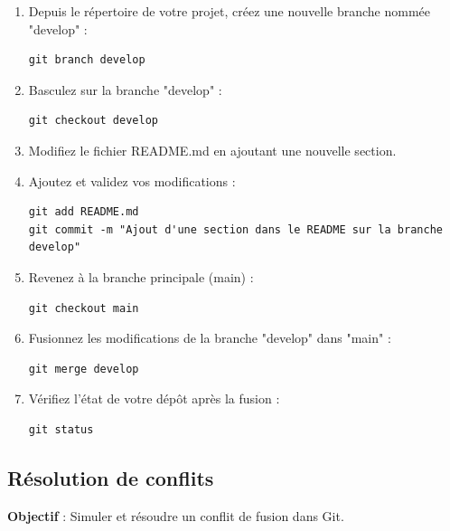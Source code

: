 \begin{enumerate}
	\item Depuis le répertoire de votre projet, créez une nouvelle branche nommée "develop" :
	\begin{verbatim}
git branch develop
	\end{verbatim}
	\item Basculez sur la branche "develop" :
	\begin{verbatim}
git checkout develop
	\end{verbatim}
	\item Modifiez le fichier README.md en ajoutant une nouvelle section.
	\item Ajoutez et validez vos modifications :
	\begin{verbatim}
git add README.md
git commit -m "Ajout d'une section dans le README sur la branche develop"
	\end{verbatim}
	\item Revenez à la branche principale (main) :
	\begin{verbatim}
git checkout main
	\end{verbatim}
	\newpage
	\item Fusionnez les modifications de la branche "develop" dans "main" :
	\begin{verbatim}
git merge develop
	\end{verbatim}
	\item Vérifiez l'état de votre dépôt après la fusion :
	\begin{verbatim}
git status
	\end{verbatim}
\end{enumerate}

\subsection*{Résolution de conflits}
{}
\noindent \textbf{Objectif} : Simuler et résoudre un conflit de fusion dans Git.

